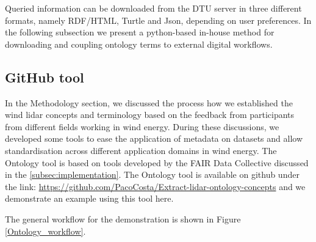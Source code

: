 \documentclass[remotesensing,article,submit,pdftex,moreauthors]{Definitions/mdpi}
\begin{document}
Queried information can be downloaded from the DTU server in three different formats, namely RDF/HTML, Turtle and Json, depending on user preferences. In the following subsection we present a python-based in-house method for downloading and coupling ontology terms to external digital workflows. 

    




\subsection{GitHub tool}
\label{GitTool}

In the Methodology section, we discussed the process how we established the wind lidar concepts and terminology based on the feedback from participants from different fields working in wind energy. During these discussions, we developed some tools to ease the application of metadata on datasets and allow standardisation across different application domains in wind energy. The Ontology tool is based on tools developed by the FAIR Data Collective discussed in the \ref{subsec:implementation}. The Ontology tool is available on github under the link: \href{https://github.com/PacoCosta/Extract-lidar-ontology-concepts}{https://github.com/PacoCosta/Extract-lidar-ontology-concepts} and we demonstrate an example using this tool here.

The general workflow for the demonstration is shown in Figure \ref{Ontology_workflow}. 
\end{document}
